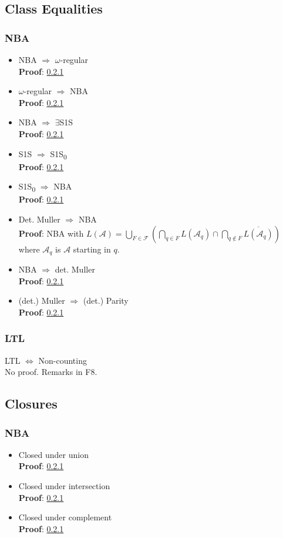\documentclass{article}
\begin{document}
\subsection{Class Equalities}
\subsubsection{NBA}
\begin{itemize}
	\item NBA $\Rightarrow$ $\omega$-regular \\
    	\textbf{Proof}: \ref{} %
	\item $\omega$-regular $\Rightarrow$ NBA \\
    	\textbf{Proof}: \ref{} %
    \item NBA $\Rightarrow$ $\exists$S1S \\
    	\textbf{Proof}: \ref{} %
    \item S1S $\Rightarrow$ S1S\textsubscript{0} \\
    	\textbf{Proof}: \ref{} %
    \item S1S\textsubscript{0} $\Rightarrow$ NBA \\
    	\textbf{Proof}: \ref{} %
    \item Det. Muller $\Rightarrow$ NBA \\
    	\textbf{Proof}: NBA with $L(\mathcal{A}) = \bigcup\limits_{F \in \mathcal{F}} \left( \bigcap\limits_{q \in F} L(\mathcal{A}_q) \cap \bigcap\limits_{q \notin F} \overline{L(\mathcal{A}_q)} \right)$ where $\mathcal{A}_q$ is $\mathcal{A}$ starting in $q$.
    \item NBA $\Rightarrow$ det. Muller \\
    	\textbf{Proof}: \ref{} %
   	\item (det.) Muller $\Rightarrow$ (det.) Parity \\
   		\textbf{Proof}: \ref{} %
\end{itemize}

\subsubsection{LTL}
LTL $\Leftrightarrow$ Non-counting \\
No proof. Remarks in F8.

\subsection{Closures}
\subsubsection{NBA}
\begin{itemize}
	\item Closed under union \\
    	\textbf{Proof}: \ref{} %
    \item Closed under intersection \\
    	\textbf{Proof}: \ref{} %
    \item Closed under complement \\
    	\textbf{Proof}: \ref{} %
\end{itemize}
\end{document}
